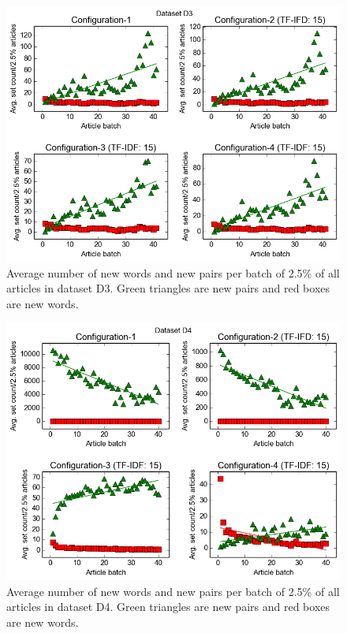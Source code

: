 \begin{figure}[ht]
  \centering
  \includegraphics[scale=0.50]{images/D3-plot.png}
  \caption{Average number of new words and new pairs per batch of 2.5\% of all articles in dataset D3. Green triangles are new pairs and red boxes are new words.}
  \label{fig:setPlot3}
\end{figure}

\begin{figure}[ht]
  \centering
  \includegraphics[scale=0.50]{images/D4-plot.png}
  \caption{Average number of new words and new pairs per batch of 2.5\% of all articles in dataset D4. Green triangles are new pairs and red boxes are new words.}
  \label{fig:setPlot4}
\end{figure}

